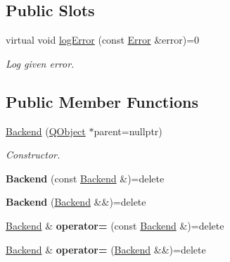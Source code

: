 \subsection*{Public Slots}
\begin{DoxyCompactItemize}
\item 
virtual void \hyperlink{class_mdt_1_1_error_logger_1_1_backend_acf37cfc576269934ca8ce04e3601058d}{log\+Error} (const \hyperlink{class_mdt_1_1_error}{Error} \&error)=0
\begin{DoxyCompactList}\small\item\em Log given error. \end{DoxyCompactList}\end{DoxyCompactItemize}
\subsection*{Public Member Functions}
\begin{DoxyCompactItemize}
\item 
\hyperlink{class_mdt_1_1_error_logger_1_1_backend_ad0e3d73ad0c0248f2d62e00f5180ca1e}{Backend} (\hyperlink{class_q_object}{Q\+Object} $\ast$parent=nullptr)
\begin{DoxyCompactList}\small\item\em Constructor. \end{DoxyCompactList}\item 
{\bfseries Backend} (const \hyperlink{class_mdt_1_1_error_logger_1_1_backend}{Backend} \&)=delete\hypertarget{class_mdt_1_1_error_logger_1_1_backend_a7bb295be149f2205fe63554e1ba06f66}{}\label{class_mdt_1_1_error_logger_1_1_backend_a7bb295be149f2205fe63554e1ba06f66}

\item 
{\bfseries Backend} (\hyperlink{class_mdt_1_1_error_logger_1_1_backend}{Backend} \&\&)=delete\hypertarget{class_mdt_1_1_error_logger_1_1_backend_aba1ff6190a3b08ca93e8edd7917a7d25}{}\label{class_mdt_1_1_error_logger_1_1_backend_aba1ff6190a3b08ca93e8edd7917a7d25}

\item 
\hyperlink{class_mdt_1_1_error_logger_1_1_backend}{Backend} \& {\bfseries operator=} (const \hyperlink{class_mdt_1_1_error_logger_1_1_backend}{Backend} \&)=delete\hypertarget{class_mdt_1_1_error_logger_1_1_backend_a9400fcafaec1e9e07da2d31dcc842b92}{}\label{class_mdt_1_1_error_logger_1_1_backend_a9400fcafaec1e9e07da2d31dcc842b92}

\item 
\hyperlink{class_mdt_1_1_error_logger_1_1_backend}{Backend} \& {\bfseries operator=} (\hyperlink{class_mdt_1_1_error_logger_1_1_backend}{Backend} \&\&)=delete\hypertarget{class_mdt_1_1_error_logger_1_1_backend_ae0beab19d09a61f83eb5feed501a7562}{}\label{class_mdt_1_1_error_logger_1_1_backend_ae0beab19d09a61f83eb5feed501a7562}

\end{DoxyCompactItemize}


